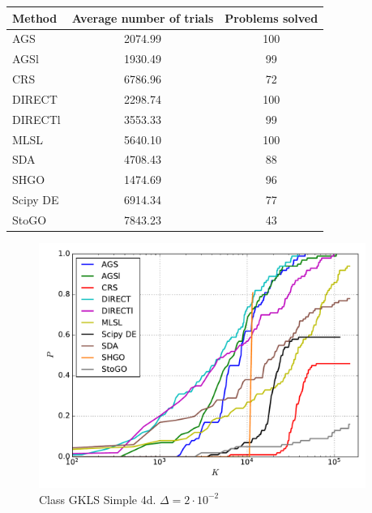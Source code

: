 \documentclass[a4paper]{article}
\begin{document}
\begin{tabular}{lcc}
\hline
 Method   &  Average number of trials  &  Problems solved  \\
\hline
 AGS      &          2074.99           &        100        \\
 AGSl     &          1930.49           &        99         \\
 CRS      &          6786.96           &        72         \\
 DIRECT   &          2298.74           &        100        \\
 DIRECTl  &          3553.33           &        99         \\
 MLSL     &          5640.10           &        100        \\
 SDA      &          4708.43           &        88         \\
 SHGO     &          1474.69           &        96         \\
 Scipy DE &          6914.34           &        77         \\
 StoGO    &          7843.23           &        43         \\
\hline
\end{tabular}
\begin{figure}[H]
  \center
  \includegraphics[width=0.95\textwidth]{../experiments/gklss4d/cmc.pdf}
  \caption{Class GKLS Simple 4d. $\Delta=2\cdot10^{-2}$}
\end{figure}
\end{document}
